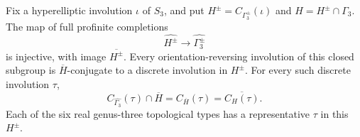 \begin{proposition}
\label{C-hyperelliptic-reflections}
Fix a hyperelliptic involution $\iota$ of $S_3$, and put
$H^{\pm}=C_{\Gamma_3^{\pm}}(\iota)$ and
$H=H^{\pm}\cap\Gamma_3$. The map of full profinite completions
\[
 \widehat{H^{\pm}}\longrightarrow\widehat{\Gamma_3^{\pm}}
\tag{C.16.1}
\]
is injective, with image $\overline{H^{\pm}}$. Every
orientation-reversing involution of this closed subgroup is
$\overline H$-conjugate to a discrete involution in $H^{\pm}$.
For every such discrete involution $\tau$,
\[
 C_{\widehat{\Gamma_3}}(\tau)\cap\overline H
       =C_{\overline H}(\tau)
       =\overline{C_H(\tau)}.
\tag{C.16.2}
\]
Each of the six real genus-three topological types has a
representative $\tau$ in this $H^{\pm}$.
\end{proposition}
